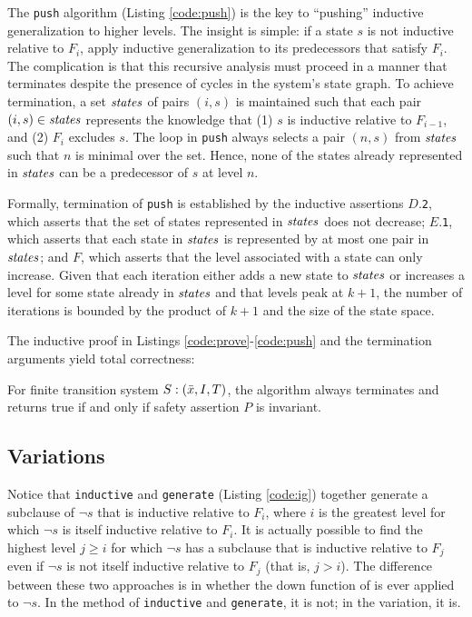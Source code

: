 \documentclass{llncs}
\newcommand{\bnot}{\neg}
\begin{document}
The {\tt push} algorithm (Listing \ref{code:push}) is the key to
``pushing'' inductive generalization to higher levels.  The insight is
simple: if a state $s$ is not inductive relative to $F_{i}$, apply
inductive generalization to its predecessors that satisfy $F_{i}$.
The complication is that this recursive analysis must proceed in a
manner that terminates despite the presence of cycles in the system's
state graph.  To achieve termination, a set $\mathit{states}$ of pairs $(i,
s)$ is maintained such that each pair $(i, s) \in \mathit{states}$ represents
the knowledge that (1) $s$ is inductive relative to $F_{i-1}$, and (2)
$F_{i}$ excludes $s$.  The loop in {\tt push} always selects a pair
$(n, s)$ from $\mathit{states}$ such that $n$ is minimal over the set.
Hence, none of the states already represented in $\mathit{states}$ can be a
predecessor of $s$ at level $n$.

Formally, termination of {\tt push} is established by the inductive
assertions $D$.{\tt 2}, which asserts that the set of states
represented in $\mathit{states}$ does not decrease; $E$.{\tt 1}, which
asserts that each state in $\mathit{states}$ is represented by at most one
pair in $\mathit{states}$; and $F$, which asserts that the level associated
with a state can only increase.  Given that each iteration either adds
a new state to $\mathit{states}$ or increases a level for some state already
in $\mathit{states}$ and that levels peak at $k+1$, the number of iterations
is bounded by the product of $k+1$ and the size of the state space.

The inductive proof in Listings \ref{code:prove}-\ref{code:push} and
the termination arguments yield total correctness:

\begin{theorem} 
\label{th:correct}
For finite transition system $S: (\bar{x}, I, T)$, the algorithm always
terminates and returns true if and only if safety assertion $P$ is
invariant.
\end{theorem}

\subsection{Variations}

Notice that {\tt inductive} and {\tt generate} (Listing \ref{code:ig})
together generate a subclause of $\bnot s$ that is inductive relative
to $F_{i}$, where $i$ is the greatest level for which $\bnot s$ is
itself inductive relative to $F_{i}$.  It is actually possible to find
the highest level $j \ge i$ for which $\bnot s$ has a subclause that
is inductive relative to $F_{j}$ even if $\bnot s$ is not itself
inductive relative to $F_{j}$ (that is, $j > i$).  The difference
between these two approaches is in whether the {\sf down} function of
\cite{Bradley+Manna/2007} is ever applied to $\bnot s$.  In the method
of {\tt inductive} and {\tt generate}, it is not; in the variation, it
is.
\end{document}
